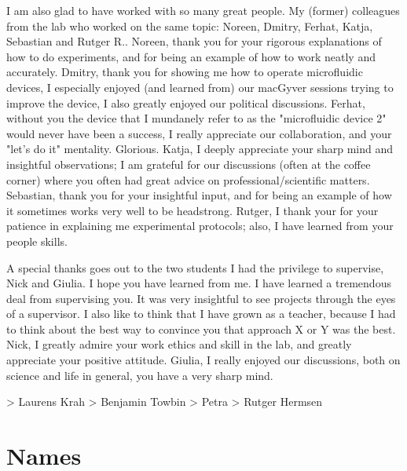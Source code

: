 
I am also glad to have worked with so many great people.
%
My (former) colleagues from the lab who worked on the same topic: 
Noreen, Dmitry, Ferhat, Katja, Sebastian and Rutger R..
%
Noreen, thank you for your rigorous explanations of how to do experiments,
and for being an example of how to work neatly and accurately.
%
Dmitry, thank you for showing me how to operate microfluidic devices,
I especially enjoyed (and learned from) our macGyver sessions trying to improve the device, 
I also greatly enjoyed our political discussions.
%
Ferhat, without you the device that I mundanely refer to as the "microfluidic device 2" would never have been a success,
I really appreciate our collaboration, and your "let's do it" mentality. Glorious.
%
Katja, I deeply appreciate your sharp mind and insightful observations; I am grateful for 
our discussions (often at the coffee corner) where you often had great advice on professional/scientific matters. 
%
Sebastian, thank you for your insightful input,
and for being an example of how it sometimes works very well to be headstrong. 
%
Rutger, I thank your for your patience in explaining me experimental protocols; 
also, I have learned from your people skills.


A special thanks goes out to the two students I had the privilege to supervise, Nick and Giulia.
%
I hope you have learned from me.
I have learned a tremendous deal from supervising you.
%
It was very insightful to see projects through the eyes of a supervisor. 
I also like to think that I have grown as a teacher, 
because I had to think about the best way to convince you that 
approach X or Y was the best.
%
Nick, I greatly admire your work ethics and skill in the lab, 
and greatly appreciate your positive attitude.
%
Giulia, I really enjoyed our discussions,
both on science and life in general,
you have a very sharp mind.



> Laurens Krah
> Benjamin Towbin
> Petra
> Rutger Hermsen










\section*{Names}


